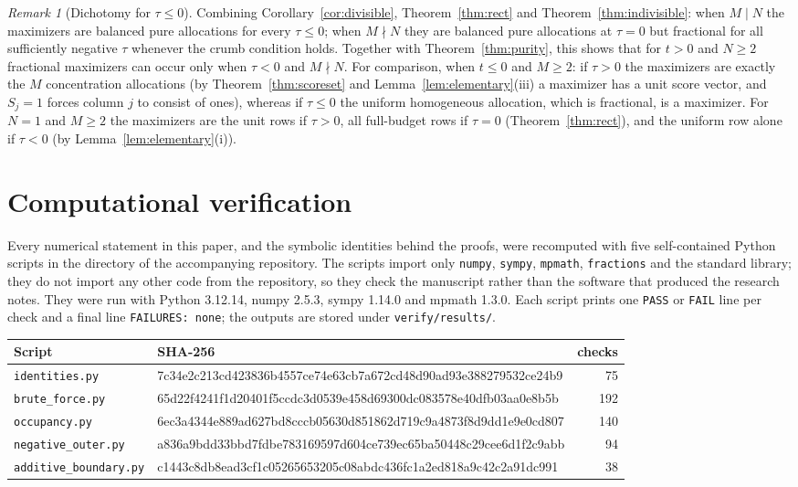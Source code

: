 \documentclass[11pt]{article}
\theoremstyle{plain}
\theoremstyle{definition}
\theoremstyle{remark}
\newtheorem{remark}[theorem]{Remark}
\begin{document}
\begin{remark}[Dichotomy for $\tau\le0$]
Combining Corollary~\ref{cor:divisible}, Theorem~\ref{thm:rect} and Theorem~\ref{thm:indivisible}: when $M\mid N$ the maximizers are balanced pure allocations for every $\tau\le0$; when $M\nmid N$ they are balanced pure allocations at $\tau=0$ but fractional for all sufficiently negative $\tau$ whenever the crumb condition holds. Together with Theorem~\ref{thm:purity}, this shows that for $t>0$ and $N\ge2$ fractional maximizers can occur only when $\tau<0$ and $M\nmid N$. For comparison, when $t\le0$ and $M\ge2$: if $\tau>0$ the maximizers are exactly the $M$ concentration allocations (by Theorem~\ref{thm:scoreset} and Lemma~\ref{lem:elementary}(iii) a maximizer has a unit score vector, and $S_j=1$ forces column $j$ to consist of ones), whereas if $\tau\le0$ the uniform homogeneous allocation, which is fractional, is a maximizer. For $N=1$ and $M\ge2$ the maximizers are the unit rows if $\tau>0$, all full-budget rows if $\tau=0$ (Theorem~\ref{thm:rect}), and the uniform row alone if $\tau<0$ (by Lemma~\ref{lem:elementary}(i)).
\end{remark}

\section{Computational verification}\label{sec:verification}

Every numerical statement in this paper, and the symbolic identities behind the proofs, were recomputed with five self-contained Python scripts in the directory  of the accompanying repository. The scripts import only \texttt{numpy}, \texttt{sympy}, \texttt{mpmath}, \texttt{fractions} and the standard library; they do not import any other code from the repository, so they check the manuscript rather than the software that produced the research notes. They were run with Python 3.12.14, numpy 2.5.3, sympy 1.14.0 and mpmath 1.3.0. Each script prints one \texttt{PASS} or \texttt{FAIL} line per check and a final line \texttt{FAILURES: none}; the outputs are stored under \texttt{verify/results/}.

\begin{center}
\small
\begin{tabular}{@{}l>{\scriptsize\ttfamily}lr@{}}
\toprule
Script & \normalfont\small SHA-256 & checks\\
\midrule
\texttt{identities.py} & 7c34e2c213cd423836b4557ce74e63cb7a672cd48d90ad93e388279532ce24b9 & 75\\
\texttt{brute\_force.py} & 65d22f4241f1d20401f5ccdc3d0539e458d69300dc083578e40dfb03aa0e8b5b & 192\\
\texttt{occupancy.py} & 6ec3a4344e889ad627bd8cccb05630d851862d719c9a4873f8d9dd1e9e0cd807 & 140\\
\texttt{negative\_outer.py} & a836a9bdd33bbd7fdbe783169597d604ce739ec65ba50448c29cee6d1f2c9abb & 94\\
\texttt{additive\_boundary.py} & c1443c8db8ead3cf1c05265653205c08abdc436fc1a2ed818a9c42c2a91dc991 & 38\\
\bottomrule
\end{tabular}
\end{center}
\end{document}
